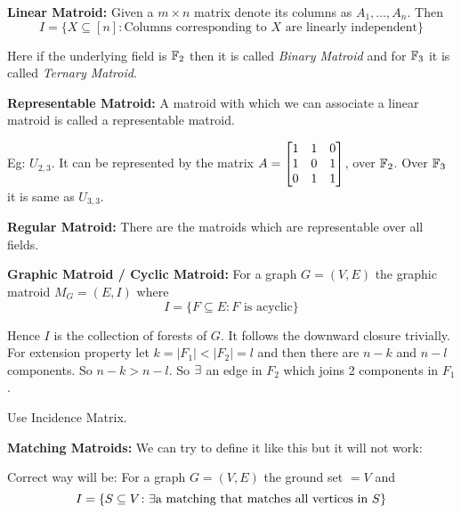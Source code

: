 \textbf{Linear Matroid:} Given a $m\times n$ matrix denote its columns as $A_1,\dots, A_n$. Then $$I=\{ X\subseteq [n]\colon \text{Columns corresponding to $X$ are linearly independent}  \}$$\parinn

Here if the underlying field is $\mathbb{F}_2$ then it is called \textit{Binary Matroid} and for $\mathbb{F}_3$ it is called \textit{Ternary Matroid}.\parinf

\textbf{Representable Matroid:} A matroid with which we can associate a linear matroid is called a representable matroid.

Eg: $U_{2,3}$. It can be represented by the matrix $A=\left[\begin{matrix}1&1&0\\ 1& 0 & 1\\ 0& 1& 1\end{matrix}\right]$, over $\mathbb{F}_2$. Over $\mathbb{F}_3$ it is same as $U_{3,3}$. 

\textbf{Regular Matroid:} There are the matroids which are representable over all fields.

\textbf{Graphic Matroid / Cyclic Matroid:} For a graph $G=(V,E)$ the graphic matroid $M_G=(E,I)$ where $$I=\{F\subseteq E\colon \text{$F$ is acyclic}\}$$

Hence $I$ is the collection of forests of $G$. It follows the downward closure trivially. For extension property let $k=|F_1|<|F_2|=l$ and then there are $n-k$ and $n-l$ components. So $n-k>n-l$. So $\exists$ an edge in $F_2$ which joins 2 components in $F_1$.

\begin{proof-idea}
	Use Incidence Matrix.
\end{proof-idea}

\textbf{Matching Matroids:} We can try to define it like this but it will not work:

\parinf

Correct way will be: For a graph $G=(V,E)$ the ground set $=V$ and $$I=\{S\subseteq V\colon \exists \text{a matching that matches all vertices in $S$}\}$$\parinn

